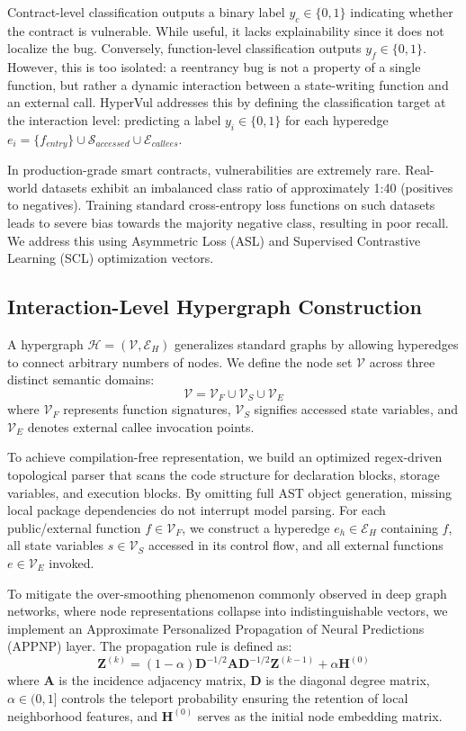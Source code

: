 \documentclass[conference]{IEEEtran}
\begin{document}
Contract-level classification outputs a binary label $y_c\in\{0,1\}$ indicating whether the contract is vulnerable. While useful, it lacks explainability since it does not localize the bug. Conversely, function-level classification outputs $y_f\in\{0,1\}$. However, this is too isolated: a reentrancy bug is not a property of a single function, but rather a dynamic interaction between a state-writing function and an external call. HyperVul addresses this by defining the classification target at the interaction level: predicting a label $y_i\in\{0,1\}$ for each hyperedge $e_i=\{f_{entry}\}\cup\mathcal{S}_{accessed}\cup\mathcal{E}_{callees}$.

In production-grade smart contracts, vulnerabilities are extremely rare. Real-world datasets exhibit an imbalanced class ratio of approximately 1:40 (positives to negatives). Training standard cross-entropy loss functions on such datasets leads to severe bias towards the majority negative class, resulting in poor recall. We address this using Asymmetric Loss (ASL) and Supervised Contrastive Learning (SCL) optimization vectors.

\subsection{Interaction-Level Hypergraph Construction}
A hypergraph $\mathcal{H}=(\mathcal{V},\mathcal{E}_H)$ generalizes standard graphs by allowing hyperedges to connect arbitrary numbers of nodes. We define the node set $\mathcal{V}$ across three distinct semantic domains:
$$ \mathcal{V}=\mathcal{V}_F\cup\mathcal{V}_S\cup\mathcal{V}_E $$
where $\mathcal{V}_F$ represents function signatures, $\mathcal{V}_S$ signifies accessed state variables, and $\mathcal{V}_E$ denotes external callee invocation points. 

To achieve compilation-free representation, we build an optimized regex-driven topological parser that scans the code structure for declaration blocks, storage variables, and execution blocks. By omitting full AST object generation, missing local package dependencies do not interrupt model parsing. For each public/external function $f\in\mathcal{V}_F$, we construct a hyperedge $e_h\in\mathcal{E}_H$ containing $f$, all state variables $s\in\mathcal{V}_S$ accessed in its control flow, and all external functions $e\in\mathcal{V}_E$ invoked. 

To mitigate the over-smoothing phenomenon commonly observed in deep graph networks, where node representations collapse into indistinguishable vectors, we implement an Approximate Personalized Propagation of Neural Predictions (APPNP) layer. The propagation rule is defined as:
$$ \mathbf{Z}^{(k)}=(1-\alpha)\mathbf{D}^{-1/2}\mathbf{A}\mathbf{D}^{-1/2}\mathbf{Z}^{(k-1)}+\alpha\mathbf{H}^{(0)} $$
where $\mathbf{A}$ is the incidence adjacency matrix, $\mathbf{D}$ is the diagonal degree matrix, $\alpha\in(0,1]$ controls the teleport probability ensuring the retention of local neighborhood features, and $\mathbf{H}^{(0)}$ serves as the initial node embedding matrix.
\end{document}
